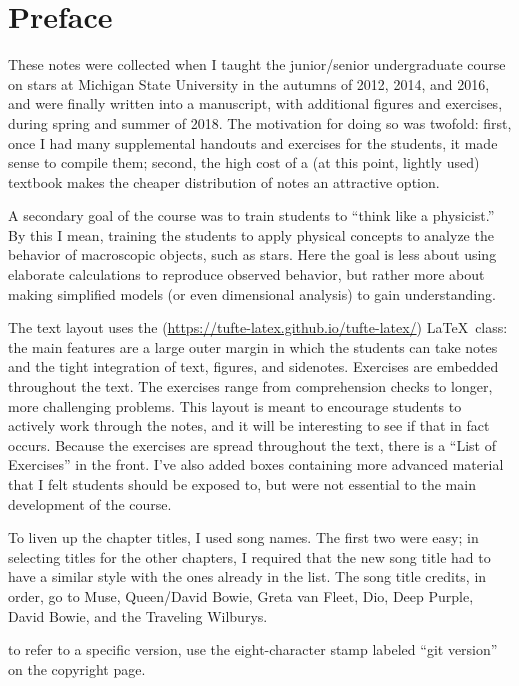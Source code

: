 
\section*{Preface}
These notes were collected when I taught the junior/senior undergraduate course on stars at Michigan State University in the autumns of 2012, 2014, and 2016, and were finally written into a manuscript, with additional figures and exercises, during spring and summer of 2018. The motivation for doing so was twofold: first, once I had many supplemental handouts and exercises for the students, it made sense to compile them; second, the high cost of a (at this point, lightly used) textbook makes the cheaper distribution of notes an attractive option.

A secondary goal of the course was to train students to ``think like a physicist.'' By this I mean, training the students to apply physical concepts to analyze the behavior of macroscopic objects, such as stars. Here the goal is less about using elaborate calculations to reproduce observed behavior, but rather more about making simplified models (or even dimensional analysis) to gain understanding.

The text layout uses the  (\url{https://tufte-latex.github.io/tufte-latex/}) \LaTeX\ class: the main features are a large outer margin in which the students can take notes and the tight integration of text, figures, and sidenotes. Exercises are embedded throughout the text. The exercises range from comprehension checks to longer, more challenging problems. This layout is meant to encourage students to actively work through the notes, and it will be interesting to see if that in fact occurs. Because the exercises are spread throughout the text, there is a ``List of Exercises'' in the front. I've also added boxes containing more advanced material that I felt students should be exposed to, but were not essential to the main development of the course. 

To liven up the chapter titles, I used song names. The first two were easy; in selecting titles for the other chapters, I required that the new song title had to have a similar style with the ones already in the list. The song title credits, in order, go to Muse, Queen/David Bowie, Greta van Fleet, Dio, Deep Purple, David Bowie, and the Traveling Wilburys.

 to refer to a specific version, use the eight-character stamp labeled ``git version'' on the copyright page.
